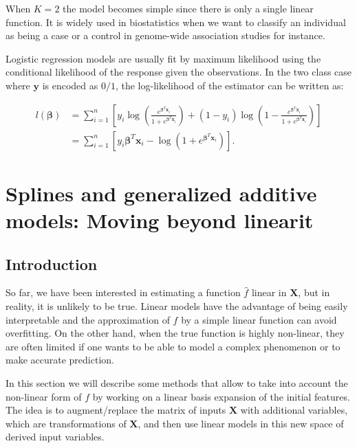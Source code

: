 \documentclass[]{book}
\begin{document}
When \(K=2\) the model becomes simple since there is only a single linear
function. It is widely used in biostatistics when we want to classify an
individual as being a case or a control in genome-wide association
studies for instance.

Logistic regression models are usually fit by maximum likelihood using
the conditional likelihood of the response given the observations. In
the two class case where \(\mathbf{y}\) is encoded as \(0/1\), the log-likelihood
of the estimator can be written as:

\[\begin{aligned}
l(\boldsymbol{\beta}) & = \sum_{i=1}^n \left[ y_i \log \left( \frac{e^{\boldsymbol{\beta}^T\boldsymbol{x}_i}}{1+e^{\boldsymbol{\beta}^T\boldsymbol{x}_i}}\right) +  (1-y_i)\log \left( 1- \frac{e^{\boldsymbol{\beta}^T\boldsymbol{x}_i}}{1+e^{\boldsymbol{\beta}^T\boldsymbol{x}_i}} \right) \right] \\
& =  \sum_{i=1}^n \left[ y_i\boldsymbol{\beta}^T\boldsymbol{x}_i - \log (1 + e^{\boldsymbol{\beta}^T\boldsymbol{x}_i}) \right]. \end{aligned}\]

\hypertarget{non-parametric}{%
\section{Splines and generalized additive models: Moving beyond linearit}\label{non-parametric}}

\hypertarget{introduction}{%
\subsection{Introduction}\label{introduction}}

So far, we have been interested in estimating a function \(\hat{f}\)
linear in \(\mathbf{X}\), but in reality, it is unlikely to be true. Linear
models have the advantage of being easily interpretable and the
approximation of \(f\) by a simple linear function can avoid overfitting.
On the other hand, when the true function is highly non-linear, they are
often limited if one wants to be able to model a complex phenomenon or
to make accurate prediction.

In this section we will describe some methods that allow to take into
account the non-linear form of \(f\) by working on a linear basis
expansion of the initial features. The idea is to augment/replace the
matrix of inputs \(\mathbf{X}\) with additional variables, which are
transformations of \(\mathbf{X}\), and then use linear models in this new space
of derived input variables.
\end{document}
